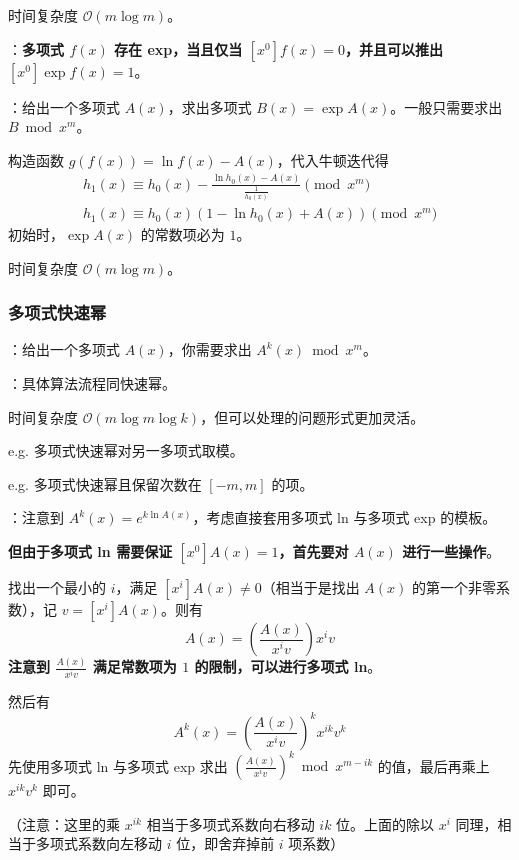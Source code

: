 时间复杂度 $\mathcal{O}(m \log m)$。

：\textbf{多项式 $f(x)$ 存在 exp，当且仅当 $[x^0]f(x) = 0$，并且可以推出 $[x^0]\exp f(x) = 1$}。

：给出一个多项式 $A(x)$，求出多项式 $B(x) = \exp A(x)$。一般只需要求出 $B \bmod{x^m}$。

构造函数 $g(f(x)) = \ln f(x) - A(x)$，代入牛顿迭代得
\[
\begin{gathered}
h_1(x) \equiv h_0(x) - \frac{\ln h_0(x) - A(x)}{\frac{1}{h_0(x)}} \pmod{x^m} \\
h_1(x) \equiv h_0(x)\left( 1 - \ln h_0(x) + A(x) \right) \pmod{x^m}
\end{gathered}
\]
初始时，$\exp A(x)$ 的常数项必为 $1$。

时间复杂度 $\mathcal{O}(m \log m)$。

\subsubsection{多项式快速幂}

：给出一个多项式 $A(x)$，你需要求出 $A^k(x) \bmod{x^m}$。

：具体算法流程同快速幂。

时间复杂度 $\mathcal{O}(m \log m \log k)$，但可以处理的问题形式更加灵活。

\begin{quoteblock}
e.g. 多项式快速幂对另一多项式取模。

e.g. 多项式快速幂且保留次数在 $[-m, m]$ 的项。
\end{quoteblock}

：注意到 $A^k(x) = e^{k\ln A(x)}$，考虑直接套用多项式 ln 与多项式 exp 的模板。

\textbf{但由于多项式 ln 需要保证 $[x^0]A(x) = 1$，首先要对 $A(x)$ 进行一些操作}。

找出一个最小的 $i$，满足 $[x^i]A(x) \neq 0$（相当于是找出 $A(x)$ 的第一个非零系数），记 $v = [x^i]A(x)$。则有
\[
A(x) = \left(\frac{A(x)}{x^iv}\right)x^iv
\]
\textbf{注意到 $\frac{A(x)}{x^iv}$ 满足常数项为 $1$ 的限制，可以进行多项式 ln}。

然后有
\[
A^k(x) = \left(\frac{A(x)}{x^iv}\right)^k x^{ik}v^k
\]
先使用多项式 ln 与多项式 exp 求出 $\left(\frac{A(x)}{x^iv}\right)^k \bmod{x^{m - ik}}$ 的值，最后再乘上 $x^{ik}v^k$ 即可。

（注意：这里的乘 $x^{ik}$ 相当于多项式系数向右移动 $ik$ 位。上面的除以 $x^i$ 同理，相当于多项式系数向左移动 $i$ 位，即舍弃掉前 $i$ 项系数）

